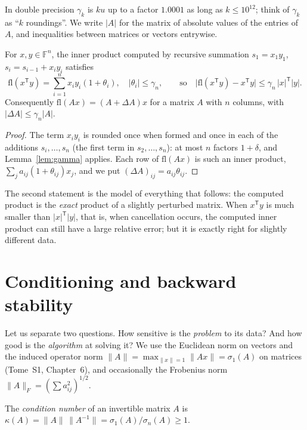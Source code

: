 In double precision $\gamma_k$ is $ku$ up to a factor $1.0001$ as long as $k\le10^{12}$; think of $\gamma_k$ as ``$k$ roundings''. We write $|A|$ for
the matrix of absolute values of the entries of $A$, and inequalities between matrices or vectors entrywise.

\begin{proposition}\label{prop:dot}
For $x,y\in\mathbb F^n$, the inner product computed by recursive summation $s_1=x_1y_1$, $s_i=s_{i-1}+x_iy_i$ satisfies
\[
\mathrm{fl}(x^{\mathsf T}y)=\sum_{i=1}^nx_iy_i(1+\theta_i),\quad|\theta_i|\le\gamma_n,\qquad\text{so}\quad\bigl|\mathrm{fl}(x^{\mathsf T}y)-x^{\mathsf T}y\bigr|\le\gamma_n\,|x|^{\mathsf T}|y|.
\]
Consequently $\mathrm{fl}(Ax)=(A+\Delta A)x$ for a matrix $A$ with $n$ columns, with $|\Delta A|\le\gamma_n|A|$.
\end{proposition}
\begin{proof}
The term $x_iy_i$ is rounded once when formed and once in each of the additions $s_i,\dots,s_n$ (the first term in $s_2,\dots,s_n$): at most $n$
factors $1+\delta$, and Lemma~\ref{lem:gamma} applies. Each row of $\mathrm{fl}(Ax)$ is such an inner product, $\sum_ja_{ij}(1+\theta_{ij})x_j$, and we put
$(\Delta A)_{ij}=a_{ij}\theta_{ij}$.
\end{proof}

The second statement is the model of everything that follows: the computed product is the \emph{exact} product of a slightly perturbed matrix. When
$x^{\mathsf T}y$ is much smaller than $|x|^{\mathsf T}|y|$, that is, when cancellation occurs, the computed inner product can still have a large
relative error; but it is exactly right for slightly different data.

\section{Conditioning and backward stability}\label{sec:conditioning}

Let us separate two questions. How sensitive is the \emph{problem} to its data? And how good is the \emph{algorithm} at solving it? We use the
Euclidean norm on vectors and the induced operator norm $\|A\|=\max_{\|x\|=1}\|Ax\|=\sigma_1(A)$ on matrices (Tome~S1, Chapter~6), and occasionally the
Frobenius norm $\|A\|_F=(\sum a_{ij}^2)^{1/2}$.

\begin{definition}\label{def:cond}
The \emph{condition number} of an invertible matrix $A$ is $\kappa(A)=\|A\|\,\|A^{-1}\|=\sigma_1(A)/\sigma_n(A)\ge1$.
\end{definition}

